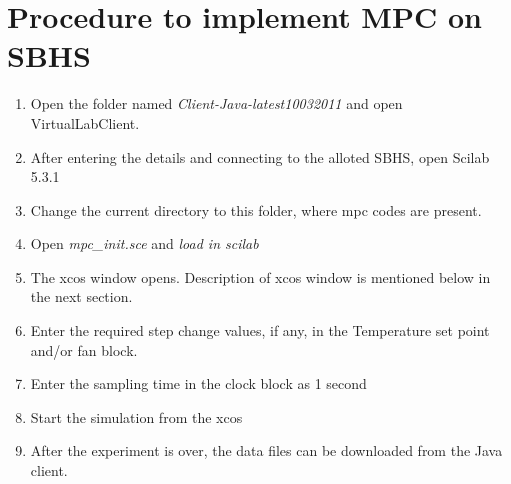 \section{Procedure to implement MPC on SBHS}
\begin{enumerate}
\item Open the folder named \emph{Client-Java-latest10032011} and open VirtualLabClient.
\item After entering the details and connecting to the alloted SBHS, open Scilab 5.3.1
\item Change the current directory to this folder, where mpc codes are present.
\item Open \emph{mpc\_init.sce} and \emph{load in scilab}
\item The xcos window opens. Description of xcos window is mentioned below in the next section.
\item Enter the required step change values, if any, in the Temperature set point and/or fan block.
\item Enter the sampling time in the clock block as 1 second
\item Start the simulation from the xcos
\item After the experiment is over, the data files can be downloaded from the Java client.
\end{enumerate}

